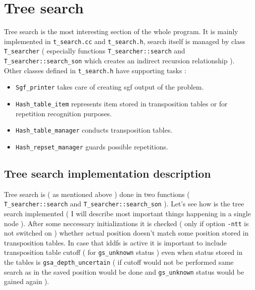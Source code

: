 \section{Tree search}\label{page_3}
Tree search is the most interesting section of the whole program. It is mainly implemented in {\tt t\_\-search.cc} and {\tt t\_\-search.h}, search itself is managed by class {\tt T\_\-searcher} ( especially functions {\tt T\_\-searcher::search} and {\tt T\_\-searcher::search\_\-son} which creates an indirect recursion relationship ). Other classes defined in {\tt t\_\-search.h} have supporting tasks :\begin{itemize}
\item {\tt Sgf\_\-printer} takes care of creating sgf output of the problem.\item {\tt Hash\_\-table\_\-item} represents item stored in transposition tables or for repetition recognition purposes.\item {\tt Hash\_\-table\_\-manager} conducts transposition tables.\item {\tt Hash\_\-repset\_\-manager} guards possible repetitions.\end{itemize}
\subsection{Tree search implementation description}\label{page_3_page_3__sec_1}
Tree search is ( as mentioned above ) done in two functions ( {\tt T\_\-searcher::search} and {\tt T\_\-searcher::search\_\-son} ). Let's see how is the tree search implemented ( I will describe most important things happening in a single node ). After some neccessary initializations it is checked ( only if option {\tt -ntt} is not switched on ) whether actual position doesn't match some position stored in transposition tables. In case that iddfs is active it is important to include transposition table cutoff ( for {\tt gs\_\-unknown} status ) even when status stored in the tables is {\tt gsa\_\-depth\_\-uncertain} ( if cutoff would not be performed same search as in the saved position would be done and {\tt gs\_\-unknown} status would be gained again ).



